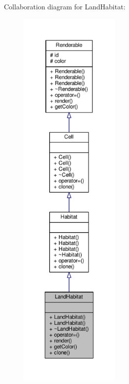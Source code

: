 Collaboration diagram for Land\+Habitat\+:
\nopagebreak
\begin{figure}[H]
\begin{center}
\leavevmode
\includegraphics[height=550pt]{classLandHabitat__coll__graph}
\end{center}
\end{figure}
